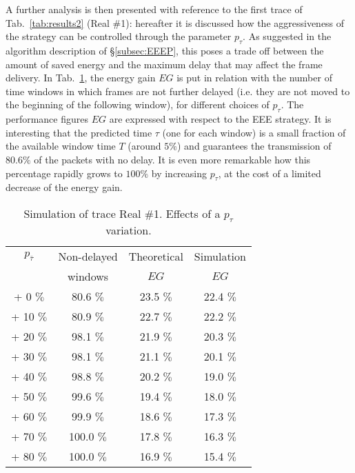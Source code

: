 \documentclass[journal,10pt,twoside,final]{IEEEtran}
\begin{document}
A further analysis is then presented with reference to the first trace of Tab.~\ref{tab:results2}  (Real \#1): 
hereafter it is discussed how the aggressiveness of the strategy can be controlled through the parameter $p_{\tau}$. As suggested in the algorithm description of \S\ref{subsec:EEEP}, this poses a trade off between the amount of saved energy and the maximum delay that may affect the frame delivery. 
In Tab.~\ref{tab:results}, the energy gain $EG$ is put in relation with the number of time windows in which frames are not further delayed (i.e. they are not moved to the beginning of the following window), for different choices of $p_{\tau}$.
The performance figures $EG$ are expressed with respect to the EEE strategy. It is interesting that the predicted time ${\tau}$ (one for each window) is a small fraction of the available window time $T$ (around $5\%$) and guarantees the transmission of $80.6\%$ of the packets with no delay. 
It is even more remarkable how this percentage rapidly grows to $100\%$ by increasing $p_{{\tau}}$, at the cost of a limited decrease of the energy gain.
\begin{table}[h]
\caption{Simulation of trace Real \#1. Effects of a $p_\tau$ variation. }
\label{tab:results}
\begin{center}
\begin{tabular}{|c|c|c|c|}
\hline 
$p_{\bar{\tau}}$ & Non-delayed & Theoretical & Simulation  \\
                            & windows &  $EG$ &   $EG$ \\
\hline
+ 0 $\%$& 80.6 $\%$ & 23.5 $\%$& 22.4 $\%$\\
+ 10 $\%$& 80.9 $\%$& 22.7 $\%$& 22.2 $\%$\\
+ 20 $\%$& 98.1 $\%$& 21.9 $\%$& 20.3 $\%$\\
+ 30 $\%$& 98.1 $\%$& 21.1 $\%$& 20.1 $\%$\\
+ 40 $\%$& 98.8 $\%$& 20.2 $\%$& 19.0 $\%$\\
+ 50 $\%$& 99.6 $\%$& 19.4 $\%$& 18.0 $\%$\\
+ 60 $\%$& 99.9 $\%$& 18.6 $\%$& 17.3 $\%$\\
+ 70 $\%$& 100.0 $\%$& 17.8 $\%$& 16.3 $\%$\\
+ 80 $\%$& 100.0 $\%$& 16.9 $\%$& 15.4 $\%$\\
\hline
\end{tabular}
\end{center}
\end{table}
\end{document}

